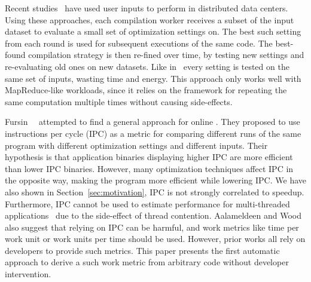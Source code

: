 Recent studies~\cite{chen12b,fang15} have used user inputs to perform {\itercomp} in distributed data centers. Using these approaches, each
compilation worker receives a subset of the input dataset to evaluate a small set of optimization settings on. The best such setting from
each round is used for subsequent executions of the same code. The best-found compilation strategy is then re-fined over time, by testing
new settings and re-evaluating old ones on new datasets. Like in~\cite{chen10} every setting is tested on the same set of inputs, wasting
time and energy. This approach only works well with MapReduce-like workloads, since it relies on the framework for repeating the same
computation multiple times without causing side-effects.

Fursin~\etal~\cite{fursin07} attempted to find a general approach for online \itercomp. They proposed to use instructions per cycle (IPC)
as a metric for comparing different runs of the same program with different optimization settings and different inputs. Their hypothesis is
that application binaries displaying higher IPC are more efficient than lower IPC binaries. However, many optimization techniques affect
IPC in the opposite way, making the program more efficient while lowering IPC. We have also shown in Section~\ref{sec:motivation}, IPC is
not strongly correlated to speedup. Furthermore, IPC cannot be used to estimate performance for multi-threaded
applications~\cite{alameldeen06,eyerman08} due to the side-effect of thread contention. Aalameldeen and Wood~\cite{alameldeen06} also
suggest that relying on IPC can be harmful, and work metrics like time per work unit or work units per time should be used. However, prior
works all rely on developers to provide such metrics. This paper presents the first automatic approach to derive a such work metric from
arbitrary code without developer intervention.




